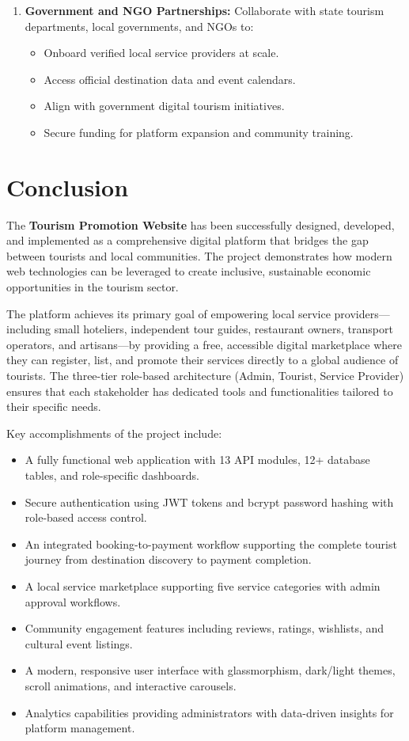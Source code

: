 \begin{enumerate}[leftmargin=2em]
    \item \textbf{Government and NGO Partnerships:} Collaborate with state tourism departments, local governments, and NGOs to:
    \begin{itemize}
        \item Onboard verified local service providers at scale.
        \item Access official destination data and event calendars.
        \item Align with government digital tourism initiatives.
        \item Secure funding for platform expansion and community training.
    \end{itemize}
\end{enumerate}

\section{Conclusion}

The \textbf{Tourism Promotion Website} has been successfully designed, developed, and implemented as a comprehensive digital platform that bridges the gap between tourists and local communities. The project demonstrates how modern web technologies can be leveraged to create inclusive, sustainable economic opportunities in the tourism sector.

The platform achieves its primary goal of empowering local service providers---including small hoteliers, independent tour guides, restaurant owners, transport operators, and artisans---by providing a free, accessible digital marketplace where they can register, list, and promote their services directly to a global audience of tourists. The three-tier role-based architecture (Admin, Tourist, Service Provider) ensures that each stakeholder has dedicated tools and functionalities tailored to their specific needs.

Key accomplishments of the project include:
\begin{itemize}[leftmargin=2em]
    \item A fully functional web application with 13 API modules, 12+ database tables, and role-specific dashboards.
    \item Secure authentication using JWT tokens and bcrypt password hashing with role-based access control.
    \item An integrated booking-to-payment workflow supporting the complete tourist journey from destination discovery to payment completion.
    \item A local service marketplace supporting five service categories with admin approval workflows.
    \item Community engagement features including reviews, ratings, wishlists, and cultural event listings.
    \item A modern, responsive user interface with glassmorphism, dark/light themes, scroll animations, and interactive carousels.
    \item Analytics capabilities providing administrators with data-driven insights for platform management.
\end{itemize}

